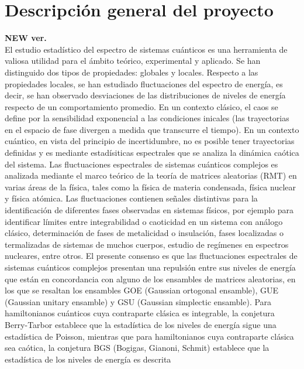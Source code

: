 \documentclass[spanish,titlepage,table]{practicas}
\begin{document}
\section{Descripción general del proyecto}\label{sec:description}
\textbf{NEW ver.}
\\
El estudio estadístico del espectro de sistemas cuánticos es una herramienta de valiosa utilidad para el ámbito teórico, experimental y aplicado.
Se han distinguido dos tipos de propiedades: globales y locales.
Respecto a las propiedades locales, se han estudiado fluctuaciones del espectro de energía, es decir, se han observado desviaciones de las distribuciones de niveles de energía respecto de un comportamiento promedio. \cite{Bohigas_1984}
\newline
En un contexto clásico, el caos se define por la sensibilidad exponencial a las condiciones inicales 
(las trayectorias en el espacio de fase divergen a medida que transcurre el tiempo). En un contexto cuántico, en vista del principio de incertidumbre, no es posible tener 
trayectorias definidas y es mediante estadísiticas espectrales que se analiza la dinámica caótica del sistema.
Las fluctuaciones espectrales de sistemas cuánticos complejos es analizada mediante 
el marco teórico de la teoría de matrices aleatorias (RMT) en varias áreas de la física, 
tales como la física de materia condensada, física nuclear y física atómica.
Las fluctuaciones contienen señales distintivas para la identificación de diferentes fases observadas 
en sistemas físicos, por ejemplo para identificar límites entre integrabilidad o caoticidad en un sistema con análogo clásico,
determinación de fases de metalicidad o insulación, fases localizadas o termalizadas de sistemas de muchos cuerpos, estudio de regímenes en espectros nucleares, entre otros. \cite{Tekur2020} \newline
El presente consenso es que las fluctuaciones espectrales de sistemas cuánticos complejos presentan 
una repulsión entre sus niveles de energía que están en concordancia con alguno de los ensambles de matrices 
aleatorias, en los que se resaltan los ensambles GOE (Gaussian ortogonal ensamble), GUE (Gaussian unitary ensamble) y GSU (Gaussian simplectic ensamble).
\newline
Para hamiltonianos cuánticos cuya contraparte clásica es integrable, la conjetura Berry-Tarbor establece que 
la estadística de los niveles de energía sigue una estadística de Poisson, mientras que para hamiltonianos 
cuya contraparte clásica sea caótica, la conjetura BGS (Bogigas, Gianoni, Schmit) establece que la estadística de los niveles de energía es descrita 
\end{document}
